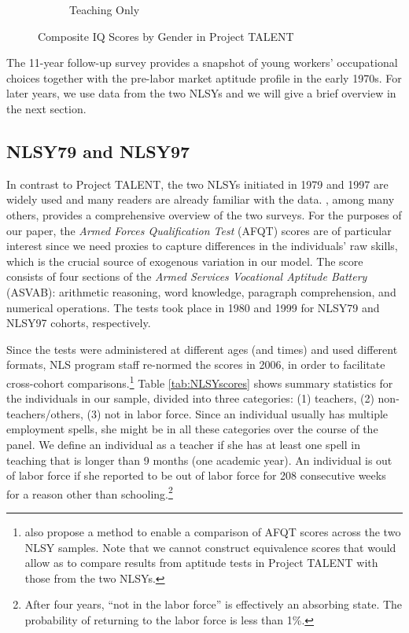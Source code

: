 \documentclass[onehalfspacing,11pt]{article}
\begin{document}
\begin{figure}
\begin{subfigure}{0.49\textwidth}
	\caption{Teaching Only}
	\label{fig:IQbygenderteach}
	\end{subfigure}
	\caption{Composite IQ Scores by Gender in Project TALENT}
	\label{fig:IQbygender}
\end{figure}

The 11-year follow-up survey provides a snapshot of young workers' occupational choices together with the pre-labor market aptitude profile in the early 1970s. For later years, we use data from the two NLSYs and we will give a brief overview in the next section.

\subsection{NLSY79 and NLSY97}
In contrast to Project TALENT, the two NLSYs initiated in 1979 and 1997 are widely used and many readers are already familiar with the data. \cite{Cooksey:2018}, among many others, provides a comprehensive overview of the two surveys. For the purposes of our paper, the {\it Armed Forces Qualification Test} (AFQT) scores are of particular interest since we need proxies to capture differences in the individuals' raw skills, which is the crucial source of exogenous variation in our model. The score consists of four sections of the {\it Armed Services Vocational Aptitude Battery} (ASVAB): arithmetic reasoning, word knowledge, paragraph comprehension, and numerical operations. The tests took place in 1980 and 1999 for NLSY79 and NLSY97 cohorts, respectively.

Since the tests were administered at different ages (and times) and used different formats, NLS program staff re-normed the scores in 2006, in order to facilitate cross-cohort comparisons.\footnote{\cite{Altonji:2009} also propose a method to enable a comparison of AFQT scores across the two NLSY samples. Note that we cannot construct equivalence scores that would allow as to compare results from aptitude tests in Project TALENT with those from the two NLSYs.} Table \ref{tab:NLSYscores} shows summary statistics for the individuals in our sample, divided into three categories: (1) teachers, (2) non-teachers/others, (3) not in labor force. Since an individual usually has multiple employment spells, she might be in all these categories over the course of the panel. We define an individual as a teacher if she has at least one spell in teaching that is longer than 9 months (one academic year). An individual is out of labor force if she reported to be out of labor force for 208 consecutive weeks for a reason other than schooling.\footnote{After four years, ``not in the labor force'' is effectively an absorbing state. The probability of returning to the labor force is less than 1\%.}
\end{document}
